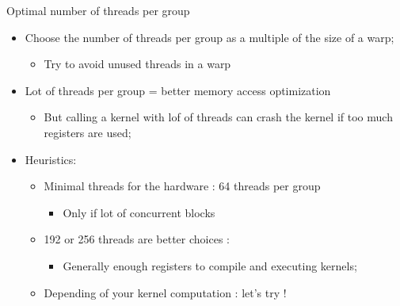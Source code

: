 \documentclass{beamer}
\begin{document}
\begin{frame}{Optimal number of threads per group}

  \begin{itemize}
  \item Choose the number of threads per group as a multiple of the size of a warp;
    \begin{itemize}
    \item Try to avoid unused threads in a warp
    \end{itemize}
  \item Lot of threads per group = better memory access optimization
    \begin{itemize}
    \item But calling a kernel with lof of threads can crash the kernel if too much
      registers are used;
    \end{itemize}
  \item Heuristics:
    \begin{itemize}
    \item Minimal threads for the hardware : 64 threads per group
      \begin{itemize}
      \item Only if lot of concurrent blocks
      \end{itemize}
    \item 192 or 256 threads are better choices :
      \begin{itemize}
      \item Generally enough registers to compile and executing kernels;
      \end{itemize}
    \item Depending of your kernel computation : let's try !
    \end{itemize}
  \end{itemize}
\end{frame}
\end{document}
